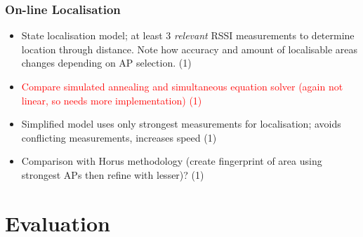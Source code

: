 \documentclass{UoYCSproject}
\begin{document}
            \subsection{On-line Localisation}
            
                \begin{itemize}
                    \item State localisation model; at least 3 \emph{relevant} RSSI measurements to determine location through distance. Note how accuracy and amount of localisable areas changes depending on AP selection. (1)
                    \item \textcolor{red}{Compare simulated annealing and simultaneous equation solver (again not linear, so needs more implementation) (1)}
                    \item Simplified model uses only strongest measurements for localisation; avoids conflicting measurements, increases speed (1)
                    \item Comparison with Horus methodology (create fingerprint of area using strongest APs then refine with lesser)? (1)
                \end{itemize}
        
	\chapter{Evaluation}
    \label{chap:eval}
	
\end{document}
